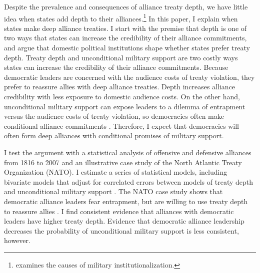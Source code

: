 \documentclass[12pt]{article}
\begin{document}
Despite the prevalence and consequences of alliance treaty depth, we have little idea when states add depth to their alliances.\footnote{\citet{Mattes2012} examines the causes of military institutionalization.}
In this paper, I explain when states make deep alliance treaties.
I start with the premise that depth is one of two ways that states can increase the credibility of their alliance commitments, and argue that domestic political institutions shape whether states prefer treaty depth.
Treaty depth and unconditional military support are two costly ways states can increase the credibility of their alliance commitments.
Because democratic leaders are concerned with the audience costs of treaty violation, they prefer to reassure allies with deep alliance treaties.
Depth increases alliance credibility with less exposure to domestic audience costs. 
On the other hand, unconditional military support can expose leaders to a dilemma of entrapment versus the audience costs of treaty violation, so democracies often make conditional alliance commitments \citep{Mattes2012, Chibaetal2015}.
Therefore, I expect that democracies will often form deep alliances with conditional promises of military support. 


I test the argument with a statistical analysis of offensive and defensive alliances from 1816 to 2007 and an illustrative case study of the North Atlantic Treaty Organization (NATO).
I estimate a series of statistical models, including bivariate models that adjust for correlated errors between models of treaty depth and unconditional military support \citep{Braumoelleretal2018}. 
The NATO case study shows that democratic alliance leaders fear entrapment, but are willing to use treaty depth to reassure allies \citep{SeawrightGerring2008, Seawright2016}. 
I find consistent evidence that alliances with democratic leaders have higher treaty depth.
Evidence that democratic alliance leadership decreases the probability of unconditional military support is less consistent, however. 
\end{document}
